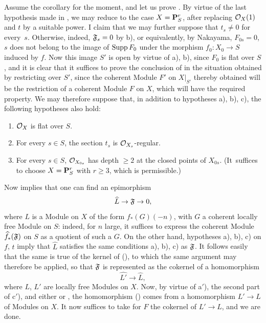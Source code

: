 Assume the corollary for the moment, and let us prove . By virtue of the last hypothesis made in , we may reduce to the case $X=\mathbf P^r_S$, after replacing $\mathcal O_X(1)$ and $t$ by a suitable power. I claim that we may further suppose that $t_s\neq 0$ for every~$s$. Otherwise, indeed, $\mathfrak F_s=0$ by b), or equivalently, by Nakayama, $F_{0s}=0$, \ie $s$ does not belong to the image of $\operatorname{Supp} F_0$ under the morphism $f_0:X_0\to S$ induced by $f$. Now this image $S'$ is open by virtue of a), b), since $F_0$ is flat over $S$, and it is clear that it suffices to prove the conclusion of  in the situation obtained by restricting over $S'$, since the coherent Module $F'$ on $X|_{S'}$ thereby obtained will be the restriction of a coherent Module $F$ on $X$, which will have the required property. We may therefore suppose that, in addition to hypotheses a), b), c), the following hypotheses also hold:
\begin{enumerate}
\item[\textup{a$'$)}] $\mathcal O_X$ is flat over $S$.
\item[\textup{b$'$)}] For every $s\in S$, the section $t_s$ is $\mathcal O_{X_s}$-regular.
\item[\textup{c$'$)}] For every $s\in S$, $\mathcal O_{X_{0s}}$ has depth $\geq 2$ at the closed points of $X_{0s}$. (It~suffices to choose $X=\mathbf P_S^r$ with $r\geq 3$, which is permissible.)
\end{enumerate}
Now  implies that one can find an epimorphism
\steco
\begin{equation} \label{eq:XII.17}
\widehat{L} \to \mathfrak F \to 0,
\end{equation}
where $L$ is a Module on $X$ of the form $f_\ast(G)(-n)$, with $G$ a coherent locally free Module on $S$: indeed, for $n$ large, it suffices to express the coherent Module $\widehat{f}_\ast(\mathfrak F)$ on $S$ as a quotient of such a $G$. On the other hand, hypotheses a), b), c) on $f$, $t$ imply that $\widehat{L}$ satisfies the same conditions a), b), c) as $\mathfrak F$. It follows easily that the same is true of the kernel of (), to which the same argument may therefore be applied, so that $\mathfrak F$ is represented as the cokernel of a homomorphism
\steco
\begin{equation} \label{eq:XII.18}
\widehat{L'} \to \widehat{L},
\end{equation}
where $L$, $L'$ are locally free Modules on $X$. Now, by virtue of a$'$), the second part of c$'$), and either  or , the homomorphism () comes from a homomorphism $L'\to L$ of Modules on $X$. It now suffices to take for $F$ the cokernel of $L'\to L$, and we are done.

